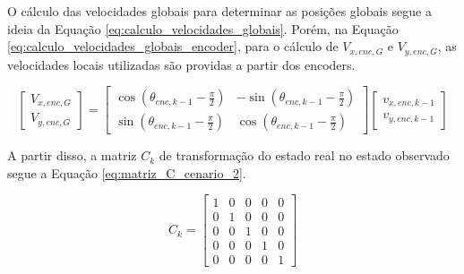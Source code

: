 \documentclass[acronym, symbols, table, deposito]{fei}
\begin{document}
			O cálculo das velocidades globais para determinar as posições globais segue a ideia da Equação \eqref{eq:calculo_velocidades_globais}. Porém, na Equação \eqref{eq:calculo_velocidades_globais_encoder}, para o cálculo de $V_{x,enc,G}$ e $V_{y,enc,G}$, as velocidades locais utilizadas são providas a partir dos encoders.
			
			\begin{equation}\label{eq:calculo_velocidades_globais_encoder}
				\begin{bmatrix}
					V_{x,enc,G} \\
					V_{y,enc,G}
				\end{bmatrix} = 
				\begin{bmatrix}
					\cos(\theta_{enc,k-1} - \frac{\pi}{2}) & -\sin(\theta_{enc,k-1} - \frac{\pi}{2}) \\
					\sin(\theta_{enc,k-1} - \frac{\pi}{2}) & \cos(\theta_{enc,k-1} - \frac{\pi}{2})
				\end{bmatrix}
				\begin{bmatrix}
					v_{x,enc,k-1} \\
					v_{y,enc,k-1}
				\end{bmatrix}
			\end{equation}
			
			
			A partir disso, a matriz $C_{k}$ de transformação do estado real no estado observado segue a Equação \eqref{eq:matriz_C_cenario_2}.
			
			\begin{equation}\label{eq:matriz_C_cenario_2}
				C_{k} = \begin{bmatrix}
					1 & 0 & 0 & 0 & 0 \\
					0 & 1 & 0 & 0 & 0 \\
					0 & 0 & 1 & 0 & 0 \\
					0 & 0 & 0 & 1 & 0 \\
					0 & 0 & 0 & 0 & 1
				\end{bmatrix}
			\end{equation}
			
\end{document}
